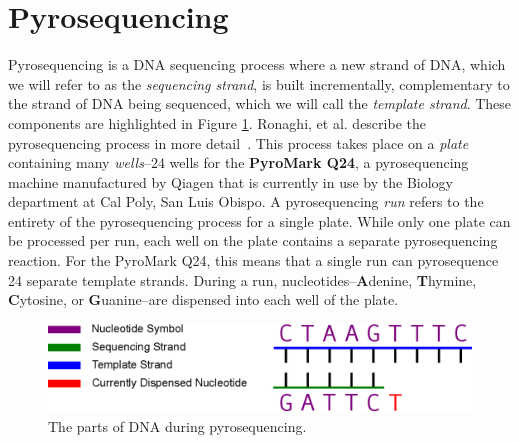 \documentclass[12pt]{ucthesis}
\begin{document}
   \section{Pyrosequencing}\label{sec:pyrosequencing}
      Pyrosequencing is a DNA sequencing process where a new strand of DNA,
      which we will refer to as the \textit{sequencing strand}, is built
      incrementally, complementary to the strand of DNA being sequenced, which
      we will call the \textit{template strand}. These components are
      highlighted in Figure \ref{fig:pyrosequencing_legend}. Ronaghi, et al.
      describe the pyrosequencing process in more
      detail~\cite{ronaghi:shedsLight}. This process takes place on a
      \textit{plate} containing many \textit{wells}--$24$ wells for the
      \textbf{PyroMark Q24}, a pyrosequencing machine manufactured by Qiagen
      that is currently in use by the Biology department at Cal Poly, San Luis
      Obispo. A pyrosequencing \textit{run} refers to the entirety of the
      pyrosequencing process for a single plate. While only one plate can be
      processed per run, each well on the plate contains a separate
      pyrosequencing reaction. For the PyroMark Q24, this means that a single
      run can pyrosequence 24 separate template strands. During a run,
      nucleotides--\textbf{A}denine, \textbf{T}hymine, \textbf{C}ytosine, or
      \textbf{G}uanine--are dispensed into each well of the plate.

      \begin{figure}[t]
         \centering
         \includegraphics[width=\textwidth]{graphics/PyrosequencingComponents.eps}
         \caption{The parts of DNA during pyrosequencing.}
         \label{fig:pyrosequencing_legend}
      \end{figure}
      
\end{document}
